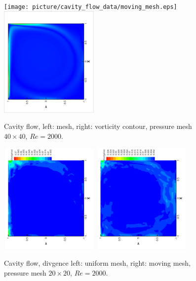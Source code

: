 \documentclass{eajam}
\begin{document}
       
       \begin{figure}[!htbp]
         \begin{center}
             \texttt{[image: picture/cavity\_flow\_data/moving\_mesh.eps]}
             \includegraphics[width = 0.43\textwidth, angle = -90]{picture/cavity_flow_data/vortex.eps}
        \end{center}
        \caption{\small Cavity flow, left: mesh, right: vorticity
          contour, pressure mesh $40 \times 40$, $Re = 2000$.}
        \label{fig::cavity_flow_mesh}
       \end{figure}

       \begin{figure}[!htbp]
         \begin{center}
             \includegraphics[width = 0.43\textwidth, angle = -90]{picture/cavity_flow_data/divergence_uniform_1.eps}
             \includegraphics[width = 0.43\textwidth, angle = -90]{picture/cavity_flow_data/divergence_moving_1.eps}
        \end{center}
        \caption{\small Cavity flow, divgence left: uniform mesh,
          right: moving mesh, pressure mesh $20 \times 20$, $Re = 2000$.}
        \label{fig::cavity_flow_divergence}
       \end{figure}
\end{document}
